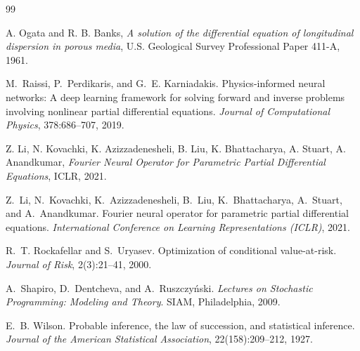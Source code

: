 \documentclass[11pt]{article}
\begin{document}
\begin{thebibliography}{99}

A. Ogata and R. B. Banks,
\textit{A solution of the differential equation of longitudinal dispersion in
porous media}, U.S. Geological Survey Professional Paper 411-A, 1961.

M.~Raissi, P.~Perdikaris, and G.~E. Karniadakis.
Physics-informed neural networks: A deep learning framework for solving forward
and inverse problems involving nonlinear partial differential equations.
\textit{Journal of Computational Physics}, 378:686--707, 2019.

Z. Li, N. Kovachki, K. Azizzadenesheli, B. Liu, K. Bhattacharya, A. Stuart,
A. Anandkumar, \textit{Fourier Neural Operator for Parametric Partial
Differential Equations}, ICLR, 2021.

Z.~Li, N.~Kovachki, K.~Azizzadenesheli, B.~Liu, K.~Bhattacharya, A.~Stuart,
and A.~Anandkumar.
Fourier neural operator for parametric partial differential equations.
\textit{International Conference on Learning Representations (ICLR)}, 2021.

R.~T. Rockafellar and S.~Uryasev.
Optimization of conditional value-at-risk.
\textit{Journal of Risk}, 2(3):21--41, 2000.

A.~Shapiro, D.~Dentcheva, and A.~Ruszczy\'nski.
\textit{Lectures on Stochastic Programming: Modeling and Theory}.
SIAM, Philadelphia, 2009.

E.~B. Wilson.
\newblock Probable inference, the law of succession, and statistical inference.
\newblock \emph{Journal of the American Statistical Association},
  22(158):209--212, 1927.

\end{thebibliography}
\end{document}
